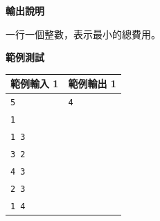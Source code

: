     \textbf{輸出說明}

    一行一個整數，表示最小的總費用。

    \textbf{範例測試}

    \begin{tabular}{|m{7cm}|m{7cm}|}
        \hline
        範例輸入 1 & 範例輸出 1 \\
        \hline
        \verb|5| & \verb|4| \\
        \verb|1| & \\
        \verb|1 3| & \\
        \verb|3 2| & \\
        \verb|4 3| & \\
        \verb|2 3| & \\
        \verb|1 4| & \\
        \hline
    \end{tabular}